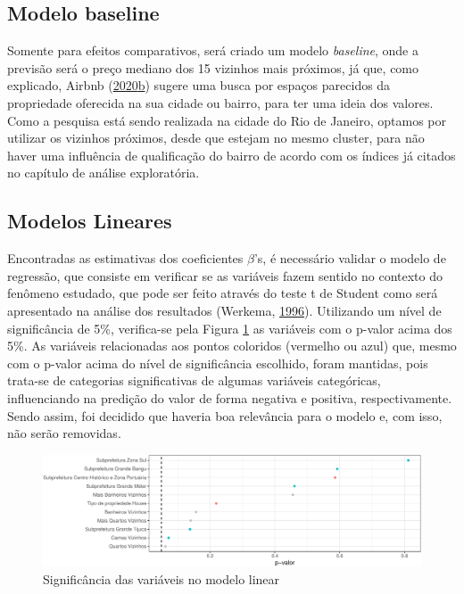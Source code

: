 \documentclass[
	12pt,				%
	a4paper,		%
	oneside,    %
	chapter=TITLE,		   %
	section=TITLE,		   %
	subsection=TITLE,	   %
	subsubsection=TITLE, %
	english,			%
	french,				%
	spanish,			%
	brazil,				%
]{abntex2}
\begin{document}
\hypertarget{modelo-baseline}{%
\subsection{Modelo baseline}\label{modelo-baseline}}

Somente para efeitos comparativos, será criado um modelo
\emph{baseline}, onde a previsão será o preço mediano dos 15 vizinhos
mais próximos, já que, como explicado, Airbnb
(\protect\hyperlink{ref-precoairbnb}{2020}\protect\hyperlink{ref-precoairbnb}{b})
sugere uma busca por espaços parecidos da propriedade oferecida na sua
cidade ou bairro, para ter uma ideia dos valores. Como a pesquisa está
sendo realizada na cidade do Rio de Janeiro, optamos por utilizar os
vizinhos próximos, desde que estejam no mesmo cluster, para não haver
uma influência de qualificação do bairro de acordo com os índices já
citados no capítulo de análise exploratória.

\hypertarget{modelos-lineares}{%
\subsection{Modelos Lineares}\label{modelos-lineares}}

Encontradas as estimativas dos coeficientes \(\beta\)'s, é necessário
validar o modelo de regressão, que consiste em verificar se as variáveis
fazem sentido no contexto do fenômeno estudado, que pode ser feito
através do teste t de Student como será apresentado na análise dos
resultados (Werkema, \protect\hyperlink{ref-werkema1996analise}{1996}).
Utilizando um nível de significância de 5\%, verifica-se pela Figura
\ref{significancia_ml} as variáveis com o p-valor acima dos 5\%. As
variáveis relacionadas aos pontos coloridos (vermelho ou azul) que,
mesmo com o p-valor acima do nível de significância escolhido, foram
mantidas, pois trata-se de categorias significativas de algumas
variáveis categóricas, influenciando na predição do valor de forma
negativa e positiva, respectivamente. Sendo assim, foi decidido que
haveria boa relevância para o modelo e, com isso, não serão removidas.

\begin{figure}
\centering
\includegraphics{00-TCC_files/figure-latex/significancia_ml-1.pdf}
\caption{\label{significancia_ml}Significância das variáveis no modelo
linear}
\end{figure}
\end{document}
